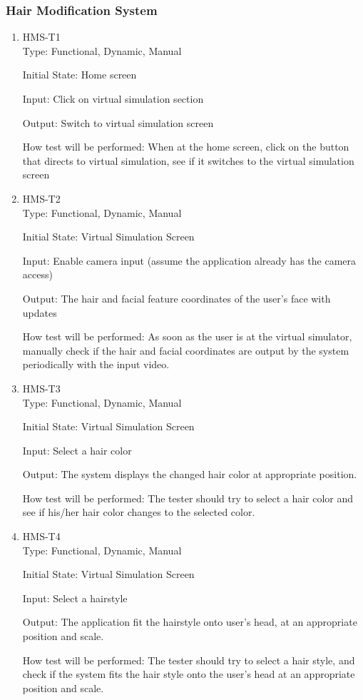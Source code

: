 \documentclass[12pt, titlepage]{article}
\begin{document}
\subsubsection{Hair Modification System}
\begin{enumerate}
\item{HMS-T1\\}
Type: Functional, Dynamic, Manual
                    
Initial State: Home screen
					
Input: Click on virtual simulation section
					
Output: Switch to virtual simulation screen
					
How test will be performed: When at the home screen, click on the button that directs to virtual simulation, see if it switches to the virtual simulation screen
\item{HMS-T2\\}
Type: Functional, Dynamic, Manual
                    
Initial State: Virtual Simulation Screen
					
Input: Enable camera input (assume the application already has the camera access)
					
Output: The hair and facial feature coordinates of the user's face with updates
					
How test will be performed: As soon as the user is at the virtual simulator, manually check if the hair and facial coordinates are output by the system periodically with the input video.

\item{HMS-T3\\}
Type: Functional, Dynamic, Manual
                    
Initial State: Virtual Simulation Screen
					
Input: Select a hair color
					
Output: The system displays the changed hair color at appropriate position.
					
How test will be performed: The tester should try to select a hair color and see if his/her hair color changes to the selected color.

\item{HMS-T4\\}
Type: Functional, Dynamic, Manual
                    
Initial State: Virtual Simulation Screen
					
Input: Select a hairstyle
					
Output: The application fit the hairstyle onto user's head, at an appropriate position and scale. 
					
How test will be performed: The tester should try to select a hair style, and check if the system fits the hair style onto the user's head at an appropriate position and scale.
\end{enumerate}
\end{document}
